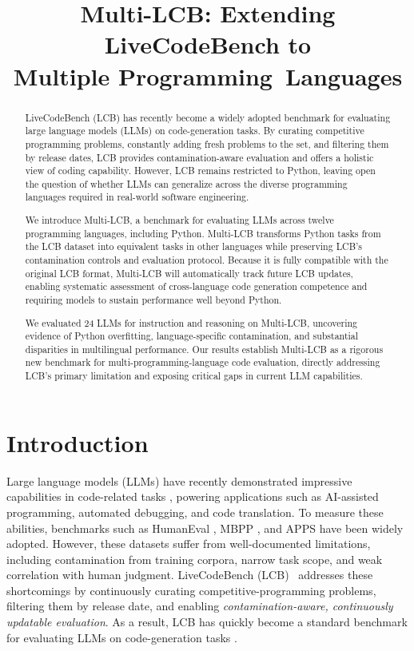 \documentclass{article} %
\title{Multi-LCB: Extending LiveCodeBench to \\ Multiple Programming~Languages
}
\begin{document}
\maketitle

\begin{abstract}
LiveCodeBench (LCB) has recently become a widely adopted benchmark for evaluating large language models (LLMs) on code-generation tasks. By curating competitive programming problems, constantly adding fresh problems to the set, and filtering them by release dates, LCB provides contamination-aware evaluation and offers a holistic view of coding capability. However, LCB remains restricted to Python, leaving open the question of whether LLMs can generalize across the diverse programming languages required in real-world software engineering.


We introduce Multi-LCB, a benchmark for evaluating LLMs across twelve programming languages, including Python.
Multi-LCB transforms Python tasks from the LCB dataset into equivalent tasks in other languages while preserving LCB’s contamination controls and evaluation protocol.
Because it is fully compatible with the original LCB format, Multi-LCB will automatically track future LCB updates, enabling systematic assessment of cross-language code generation competence and requiring models to sustain performance well beyond Python.

We evaluated 24 LLMs for instruction and reasoning on Multi-LCB, uncovering evidence of Python overfitting, language-specific contamination, and substantial disparities in multilingual performance. Our results establish Multi-LCB as a rigorous new benchmark for multi-programming-language code evaluation, directly addressing LCB’s primary limitation and exposing critical gaps in current LLM capabilities. %
\end{abstract}



\section{Introduction}
Large language models (LLMs) have recently demonstrated impressive capabilities in code-related tasks \citep{ridnik2024code, lozhkov2024starcoder, roziere2023code, li2022competition, nijkamp2022codegen}, powering applications such as AI-assisted programming, automated debugging, and code translation. To measure these abilities, benchmarks such as HumanEval \citep{chen2021evaluating}, MBPP \citep{austin2021program}, and APPS \citep{hendrycks2021measuring} have been widely adopted. However, these datasets suffer from well-documented limitations, including contamination from training corpora, narrow task scope, and weak correlation with human judgment.  
LiveCodeBench (LCB)~\citep{jain2024livecodebench} addresses these shortcomings by continuously curating competitive-programming problems, filtering them by release date, and enabling \textit{contamination-aware, continuously updatable evaluation}. As a result, LCB has quickly become a standard benchmark for evaluating LLMs on code-generation tasks \citep{kavukcuoglu2025, deepseek2025r1_0528}.
\end{document}
